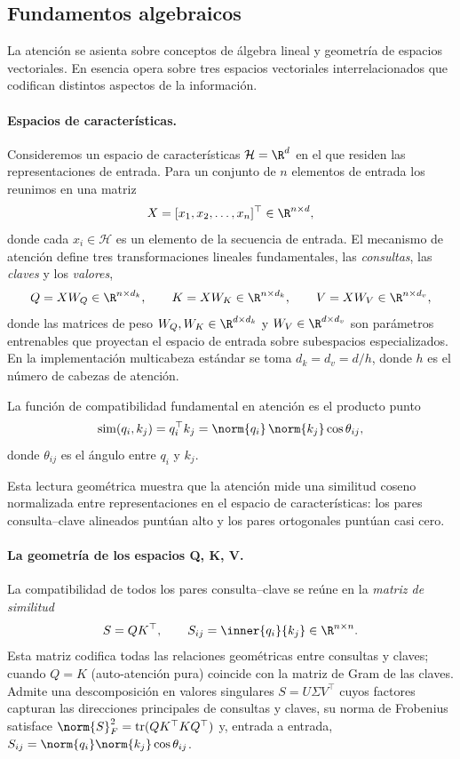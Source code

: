 \subsection{Fundamentos algebraicos}
\label{subsec:apps:attn-algebra}

La atenci\'on se asienta sobre conceptos de \'algebra lineal y geometr\'ia de
espacios vectoriales. En esencia opera sobre tres espacios vectoriales
interrelacionados que codifican distintos aspectos de la informaci\'on.

\paragraph{Espacios de caracter\'isticas.}
Consideremos un espacio de caracter\'isticas $\mathcal{H} = \R^d$ en el que
residen las representaciones de entrada. Para un conjunto de $n$ elementos de
entrada los reunimos en una matriz
\[
  X = [x_1, x_2, \dots, x_n]^\top \in \R^{n \times d},
\]
donde cada $x_i \in \mathcal{H}$ es un elemento de la secuencia de entrada. El
mecanismo de atenci\'on define tres transformaciones lineales fundamentales, las
\emph{consultas}, las \emph{claves} y los \emph{valores},
\[
  Q = X W_Q \in \R^{n\times d_k},
  \qquad
  K = X W_K \in \R^{n\times d_k},
  \qquad
  V = X W_V \in \R^{n\times d_v},
\]
donde las matrices de peso $W_Q, W_K \in \R^{d\times d_k}$ y
$W_V \in \R^{d\times d_v}$ son par\'ametros entrenables que proyectan el espacio
de entrada sobre subespacios especializados. En la implementaci\'on multicabeza
est\'andar se toma $d_k = d_v = d/h$, donde $h$ es el n\'umero de cabezas de
atenci\'on.

\begin{definition}
\label{def:apps:dot-similarity}
La funci\'on de compatibilidad fundamental en atenci\'on es el producto punto
\[
  \operatorname{sim}(q_i, k_j) = q_i^\top k_j
  = \norm{q_i}\,\norm{k_j}\cos\theta_{ij},
\]
donde $\theta_{ij}$ es el \'angulo entre $q_i$ y $k_j$.
\end{definition}

Esta lectura geom\'etrica muestra que la atenci\'on mide una similitud coseno
normalizada entre representaciones en el espacio de caracter\'isticas: los pares
consulta--clave alineados punt\'uan alto y los pares ortogonales punt\'uan casi
cero.

\paragraph{La geometr\'ia de los espacios Q, K, V.}
La compatibilidad de todos los pares consulta--clave se re\'une en la
\emph{matriz de similitud}
\[
  S = Q K^\top, \qquad S_{ij} = \inner{q_i}{k_j} \in \R^{n\times n}.
\]
Esta matriz codifica todas las relaciones geom\'etricas entre consultas y
claves; cuando $Q = K$ (auto-atenci\'on pura) coincide con la matriz de Gram de
las claves. Admite una descomposici\'on en valores singulares
$S = U\Sigma V^\top$ cuyos factores capturan las direcciones principales de
consultas y claves, su norma de Frobenius satisface
$\norm{S}_F^2 = \operatorname{tr}(QK^\top K Q^\top)$ y, entrada a entrada,
$S_{ij} = \norm{q_i}\norm{k_j}\cos\theta_{ij}$.

